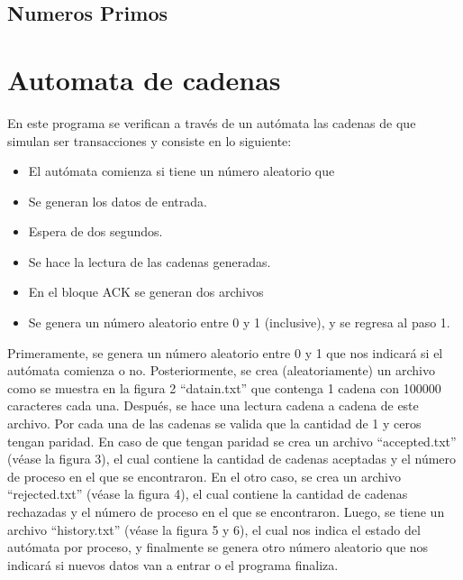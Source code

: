 \documentclass[a4paper]{article}
\begin{document}
			\subsection{Numeros Primos}
		\section{Automata de cadenas}
			En este programa se verifican a través de un autómata las cadenas de que simulan ser transacciones y consiste en lo siguiente: 
			\begin{itemize}
\item El autómata comienza si tiene un número aleatorio que 
\item Se generan los datos de entrada.
\item Espera de dos segundos.
\item Se hace la lectura de las cadenas generadas.
\item En el bloque ACK se generan dos archivos 
\item  Se genera un número aleatorio entre 0 y 1 (inclusive), y se regresa al paso 1. 
\end{itemize}
Primeramente, se genera un número aleatorio entre 0 y 1 que nos indicará si el autómata comienza o no.
Posteriormente, se crea (aleatoriamente) un archivo como se muestra en la figura 2 ``datain.txt''  que contenga 1 cadena con 100000 caracteres cada una.
Después, se hace una lectura cadena a cadena de este archivo. Por cada una de las cadenas se valida que la cantidad de 1 y ceros tengan paridad. 
En caso de que tengan paridad se crea un archivo ``accepted.txt'' (véase la figura 3), el cual contiene la cantidad de cadenas aceptadas y el número de proceso en el que se encontraron. 
En el otro caso, se crea un archivo ``rejected.txt'' (véase la figura 4), el cual contiene la cantidad de cadenas rechazadas y el número de proceso en el que se encontraron. 
Luego, se tiene un archivo ``history.txt'' (véase la figura 5 y 6), el cual nos indica el estado del autómata por proceso, y finalmente se genera otro número aleatorio que nos indicará si nuevos datos van a entrar o el programa finaliza. 
\end{document}
